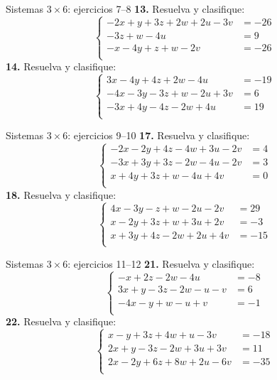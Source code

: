 \documentclass[aspectratio=169]{beamer}
\begin{document}
\begin{frame}{Sistemas $3\times 6$: ejercicios 7--8}
\scriptsize
\textbf{13.} Resuelva y clasifique:
\[\left\{\begin{aligned}
-2x+y+3z+2w+2u-3v&=-26\\
-3z+w-4u&=9\\
-x-4y+z+w-2v&=-26\\
\end{aligned}\right.\]
\textbf{14.} Resuelva y clasifique:
\[\left\{\begin{aligned}
3x-4y+4z+2w-4u&=-19\\
-4x-3y-3z+w-2u+3v&=6\\
-3x+4y-4z-2w+4u&=19\\
\end{aligned}\right.\]
\end{frame}
\begin{frame}{Sistemas $3\times 6$: ejercicios 9--10}
\scriptsize
\textbf{17.} Resuelva y clasifique:
\[\left\{\begin{aligned}
-2x-2y+4z-4w+3u-2v&=4\\
-3x+3y+3z-2w-4u-2v&=3\\
x+4y+3z+w-4u+4v&=0\\
\end{aligned}\right.\]
\textbf{18.} Resuelva y clasifique:
\[\left\{\begin{aligned}
4x-3y-z+w-2u-2v&=29\\
x-2y+3z+w+3u+2v&=-3\\
x+3y+4z-2w+2u+4v&=-15\\
\end{aligned}\right.\]
\end{frame}
\begin{frame}{Sistemas $3\times 6$: ejercicios 11--12}
\scriptsize
\textbf{21.} Resuelva y clasifique:
\[\left\{\begin{aligned}
-x+2z-2w-4u&=-8\\
3x+y-3z-2w-u-v&=6\\
-4x-y+w-u+v&=-1\\
\end{aligned}\right.\]
\textbf{22.} Resuelva y clasifique:
\[\left\{\begin{aligned}
x-y+3z+4w+u-3v&=-18\\
2x+y-3z-2w+3u+3v&=11\\
2x-2y+6z+8w+2u-6v&=-35\\
\end{aligned}\right.\]
\end{frame}
\end{document}
